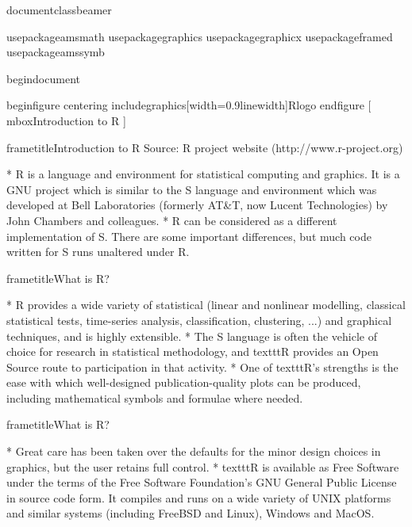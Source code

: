  documentclass{beamer}
 
 usepackage{amsmath}
 usepackage{graphics}
 usepackage{graphicx}
 usepackage{framed}
 usepackage{amssymb}
 
 begin{document}
 	
 		begin{figure}
 			centering
 			includegraphics[width=0.9linewidth]{Rlogo}
 		end{figure}
 		[ mbox{Introduction to R} ] 
 	
 	
 	
 		frametitle{Introduction to R}
 		Source: R project website (http://www.r-project.org)
 		
 			         * R is a language and environment for statistical computing and graphics. It is a GNU project
 			which is similar to the S language and environment which was developed at Bell Laboratories
 			(formerly AT&T, now Lucent Technologies) by John Chambers and colleagues. 
 			         * R can be considered
 			as a different implementation of S. There are some important differences, but much
 			code written for S runs unaltered under R.
 		
 		
 	
 	
 	
 		frametitle{What is R?}
 		
 			         * R provides a wide variety of statistical (linear and nonlinear modelling, classical statistical tests,
 			time-series analysis, classification, clustering, ...) and graphical techniques, and is highly extensible.
 			         * The S language is often the vehicle of choice for research in statistical methodology,
 			and texttt{R} provides an Open Source route to participation in that activity.
 			         * One of texttt{R}’s strengths is the ease with which well-designed publication-quality plots can be
 			produced, including mathematical symbols and formulae where needed. 
 			
 			
 		
 		
 		
 			frametitle{What is R?}
 			
 			         * Great care has been
 			taken over the defaults for the minor design choices in graphics, but the user retains full control.
 			         * texttt{R} is available as Free Software under the terms of the Free Software Foundation’s GNU General
 			Public License in source code form. It compiles and runs on a wide variety of UNIX platforms
 			and similar systems (including FreeBSD and Linux), Windows and MacOS.
 		
